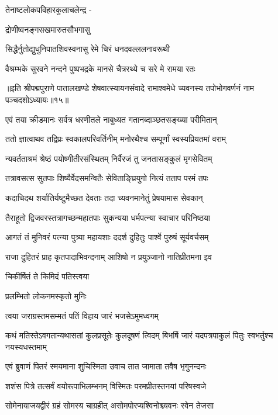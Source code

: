 तेनाष्टलोकपविहारकुलाचलेन्द्र -

द्रोणीष्वनङ्गसखमारुतसौभगासु

\twolineshloka
{सिद्धैर्नुतोद्युधुनिपातशिवस्वनासु}
{रेमे चिरं धनदवल्ललनावरूथी}%

\twolineshloka
{वैश्रम्भके सुरवने नन्दने पुष्पभद्रके}
{मानसे चैत्ररथ्ये च सरे मे रामया रतः}%

॥इति श्रीपद्मपुराणे पातालखण्डे शेषवात्स्यायनसंवादे रामाश्वमेधे च्यवनस्य तपोभोगवर्णनं नाम पञ्चदशोऽध्यायः॥१५॥



\twolineshloka
{एवं तया क्रीडमानः सर्वत्र धरणीतले}
{नाबुध्यत गतानब्दाञ्छतसङ्ख्या परीमितान्}%

\twolineshloka
{ततो ज्ञात्वाथव तद्विप्रः स्वकालपरिवर्तिनीम्}
{मनोरथैश्च सम्पूर्णां स्वस्यप्रियतमां वराम्}%

\twolineshloka
{न्यवर्तताश्रमं श्रेष्ठं पयोष्णीतीरसंस्थितम्}
{निर्वैरजं तु जनतासङ्कुलं मृगसेवितम्}%

\twolineshloka
{तत्रावसत्स सुतपाः शिष्यैर्वेदसमन्वितैः}
{सेविताङ्घ्रियुगो नित्यं तताप परमं तपः}%

\twolineshloka
{कदाचिदथ शर्यातिर्यष्टुमैच्छत देवताः}
{तदा च्यवनमानेतुं प्रेषयामास सेवकान्}%

\twolineshloka
{तैराहूतो द्विजवरस्तत्रागच्छन्महातपाः}
{सुकन्यया धर्मपत्न्या स्वाचार परिनिष्ठया}%

\twolineshloka
{आगतं तं मुनिवरं पत्न्या पुत्र्या महायशाः}
{ददर्श दुहितुः पार्श्वे पुरुषं सूर्यवर्चसम्}%

\twolineshloka
{राजा दुहितरं प्राह कृतपादाभिवन्दनाम्}
{आशिषो न प्रयुञ्जानो नातिप्रीतमना इव}%

चिकीर्षितं ते किमिदं पतिस्त्वया

प्रलम्भितो लोकनमस्कृतो मुनिः

\twolineshloka
{त्वया जराग्रस्तमसम्मतं पतिं}
{विहाय जारं भजसेऽमुमध्वगम्}%

\twolineshloka
{कथं मतिस्तेऽवगतान्यथासतां कुलप्रसूतेः कुलदूषणं त्विदम्}
{बिभर्षि जारं यदपत्रपाकुलं पितुः स्वभर्तुश्च नयस्यधस्तमाम्}%

\twolineshloka
{एवं ब्रुवाणं पितरं स्मयमाना शुचिस्मिता}
{उवाच तात जामाता तवैष भृगुनन्दनः}%

\twolineshloka
{शशंस पित्रे तत्सर्वं वयोरूपाभिलम्भनम्}
{विस्मितः परमप्रीतस्तनयां परिषस्वजे}%

\twolineshloka
{सोमेनायाजयद्वीरं ग्रहं सोमस्य चाग्रहीत्}
{असोमपोरप्यश्विनोश्च्यवनः स्वेन तेजसा}%

